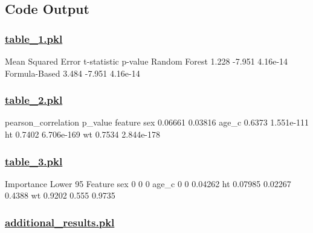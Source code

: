 \documentclass[11pt]{article}
\begin{document}
\subsection{Code Output}\hypertarget{file-table-1-pkl}{}

\subsubsection*{\hyperlink{code-Data Analysis-table-1-pkl}{table\_1.pkl}}

\begin{codeoutput}
               Mean Squared Error  t-statistic   p-value
Random Forest               1.228       -7.951  4.16e-14
Formula-Based               3.484       -7.951  4.16e-14
\end{codeoutput}\hypertarget{file-table-2-pkl}{}

\subsubsection*{\hyperlink{code-Data Analysis-table-2-pkl}{table\_2.pkl}}

\begin{codeoutput}
         pearson_correlation    p_value
feature                                
sex                  0.06661    0.03816
age_c                 0.6373 1.551e-111
ht                    0.7402 6.706e-169
wt                    0.7534 2.844e-178
\end{codeoutput}\hypertarget{file-table-3-pkl}{}

\subsubsection*{\hyperlink{code-Data Analysis-table-3-pkl}{table\_3.pkl}}

\begin{codeoutput}
         Importance  Lower 95%
Feature                                        
sex               0             0             0
age_c             0             0       0.04262
ht          0.07985       0.02267        0.4388
wt           0.9202         0.555        0.9735
\end{codeoutput}\hypertarget{file-additional-results-pkl}{}

\subsubsection*{\hyperlink{code-Data Analysis-additional-results-pkl}{additional\_results.pkl}}
\end{document}
